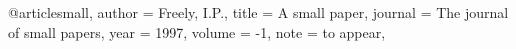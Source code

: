 
@article{small,
	author = {Freely, I.P.},
	title = {A small paper},
	journal = {The journal of small papers},
	year = 1997,
	volume = {-1},
	note = {to appear},
}
